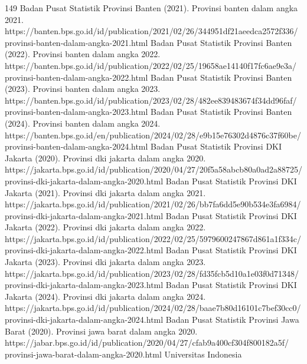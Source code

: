 149
Badan Pusat Statistik Provinsi Banten (2021). Provinsi banten dalam angka
2021. https://banten.bps.go.id/id/publication/2021/02/26/344951df21aeedca2572f336/
provinsi-banten-dalam-angka-2021.html
Badan Pusat Statistik Provinsi Banten (2022). Provinsi banten dalam angka
2022. https://banten.bps.go.id/id/publication/2022/02/25/19658ae14140f17fc6ae9e3a/
provinsi-banten-dalam-angka-2022.html
Badan Pusat Statistik Provinsi Banten (2023). Provinsi banten dalam angka
2023. https://banten.bps.go.id/id/publication/2023/02/28/482ee839483674f34dd96faf/
provinsi-banten-dalam-angka-2023.html
Badan Pusat Statistik Provinsi Banten (2024). Provinsi banten dalam angka
2024. https://banten.bps.go.id/en/publication/2024/02/28/e9b15e76302d4876c37f60be/
provinsi-banten-dalam-angka-2024.html
Badan Pusat Statistik Provinsi DKI Jakarta (2020). Provinsi dki jakarta dalam angka
2020. https://jakarta.bps.go.id/id/publication/2020/04/27/20f5a58abcb80a0ad2a88725/
provinsi-dki-jakarta-dalam-angka-2020.html
Badan Pusat Statistik Provinsi DKI Jakarta (2021). Provinsi dki jakarta dalam angka
2021. https://jakarta.bps.go.id/id/publication/2021/02/26/bb7fa6dd5e90b534e3fa6984/
provinsi-dki-jakarta-dalam-angka-2021.html
Badan Pusat Statistik Provinsi DKI Jakarta (2022). Provinsi dki jakarta dalam angka
2022. https://jakarta.bps.go.id/id/publication/2022/02/25/5979600247867d861a1f334c/
provinsi-dki-jakarta-dalam-angka-2022.html
Badan Pusat Statistik Provinsi DKI Jakarta (2023). Provinsi dki jakarta dalam angka
2023. https://jakarta.bps.go.id/id/publication/2023/02/28/fd35fcb5d10a1e03f0d71348/
provinsi-dki-jakarta-dalam-angka-2023.html
Badan Pusat Statistik Provinsi DKI Jakarta (2024). Provinsi dki jakarta dalam angka
2024. https://jakarta.bps.go.id/id/publication/2024/02/28/baae7b80d16101c7bef30cc0/
provinsi-dki-jakarta-dalam-angka-2024.html
Badan Pusat Statistik Provinsi Jawa Barat (2020). Provinsi jawa barat dalam angka
2020. https://jabar.bps.go.id/id/publication/2020/04/27/cfab9a400cf304f800182a5f/
provinsi-jawa-barat-dalam-angka-2020.html
Universitas Indonesia


